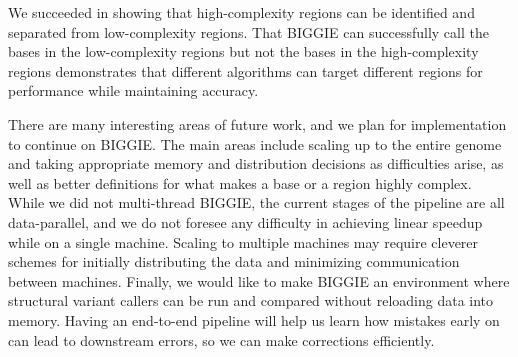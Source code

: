 \documentclass[10pt]{article}
\begin{document}
We succeeded in showing that high-complexity regions can be identified and separated from low-complexity regions.
That BIGGIE can successfully call the bases in the low-complexity regions but not the bases in the high-complexity regions demonstrates that different algorithms can target different regions for performance while maintaining accuracy.

There are many interesting areas of future work, and we plan for implementation to continue on BIGGIE.
The main areas include scaling up to the entire genome and taking appropriate memory and distribution decisions as difficulties arise, as well as better definitions for what makes a base or a region highly complex.
While we did not multi-thread BIGGIE, the current stages of the pipeline are all data-parallel, and we do not foresee any difficulty in achieving linear speedup while on a single machine.
Scaling to multiple machines may require cleverer schemes for initially distributing the data and minimizing communication between machines.
Finally, we would like to make BIGGIE an environment where structural variant callers can be run and compared without reloading data into memory.
Having an end-to-end pipeline will help us learn how mistakes early on can lead to downstream errors, so we can make corrections efficiently. 

\onecolumn
\end{document}
